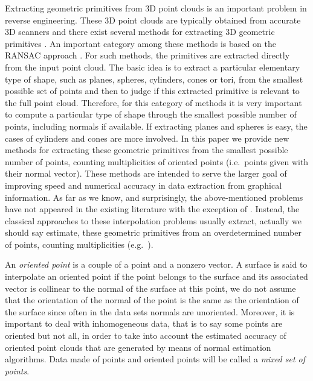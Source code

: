 \documentclass[5p]{elsarticle}
\newcommand{\com}[1]{{\color{black} #1}}
\begin{document}
 \com{Extracting} geometric primitives from 3D point clouds is an important problem in reverse engineering. These 3D point clouds are typically obtained \com{from} accurate 3D scanners and there exist several methods for \com{extracting} 3D geometric primitives \cite{PA}. An important category among these methods \com{is based} on the RANSAC approach \cite{Fischler:1981:RSC:358669.358692,schnabel-2007-efficient,PA}. For such methods, the primitives are \com{extracted directly}  from the input point cloud. The basic idea is to extract a particular elementary type of shape, such as planes, spheres, cylinders, cones or tori, from the smallest possible set of points and then to judge if this extracted primitive is relevant to the full point cloud. Therefore, for this category of methods it is very important to compute a particular type of shape through the smallest possible number of points, including normals if available. If \com{extracting} planes and spheres is easy, the cases of cylinders and cones are more involved. In this paper we provide new methods for extracting these geometric primitives from the smallest possible number of points, counting multiplicities of oriented points (i.e.~points given with their normal vector). \com{These methods are intended to serve the larger goal of improving speed and numerical accuracy in data extraction from graphical information.}   As far as we know, and surprisingly, the above-mentioned problems have not appeared in the existing literature with the exception of \cite{Devillers02,Lichtblau12}. Instead, the classical approaches to these interpolation problems usually extract, actually we should say estimate, these geometric primitives from an overdetermined number of points, counting multiplicities (e.g.~\cite{Lukacs:1998aa}).

\medskip

An \emph{oriented point} is a couple of a point and a nonzero vector. A surface is said to interpolate an oriented point if the point belongs to the surface and its associated vector is \com{collinear} to the normal of the surface at this point, we do not assume that the orientation of the normal of the point is the same as the orientation of the surface since often in the data sets normals are unoriented. Moreover, it is important to deal with inhomogeneous data, that is to say some points are oriented but not all, in order to take into account the estimated accuracy of oriented point clouds that are \com{generated} by means of normal estimation algorithms. \com{Data} made of points and oriented points will be called a \emph{mixed set of points}.
\end{document}
